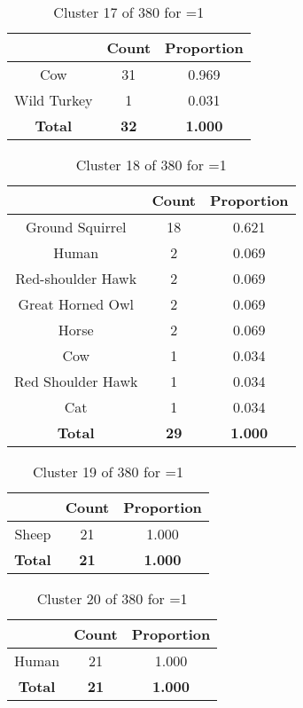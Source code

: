 \begin{table}[ht!]
\centering
\begin{tabular}{|c|c|c|}
\hline
\bf \Spec{} &\bf Count &\bf Proportion\\ \hline \hline
Cow & 31 & 0.969\\ \hline
Wild Turkey & 1 & 0.031\\ \hline
\hline
\bf Total & \bf 32 & \bf 1.000\\ \hline
\end{tabular}
\label{tab:cluster:17:1}
\caption{Cluster 17 of 380 for \minneigh{}=1}
\end{table}

\begin{table}[ht!]
\centering
\begin{tabular}{|c|c|c|}
\hline
\bf \Spec{} &\bf Count &\bf Proportion\\ \hline \hline
Ground Squirrel & 18 & 0.621\\ \hline
Human & 2 & 0.069\\ \hline
Red-shoulder Hawk & 2 & 0.069\\ \hline
Great Horned Owl & 2 & 0.069\\ \hline
Horse & 2 & 0.069\\ \hline
Cow & 1 & 0.034\\ \hline
Red Shoulder Hawk & 1 & 0.034\\ \hline
Cat & 1 & 0.034\\ \hline
\hline
\bf Total & \bf 29 & \bf 1.000\\ \hline
\end{tabular}
\label{tab:cluster:18:1}
\caption{Cluster 18 of 380 for \minneigh{}=1}
\end{table}

\begin{table}[ht!]
\centering
\begin{tabular}{|c|c|c|}
\hline
\bf \Spec{} &\bf Count &\bf Proportion\\ \hline \hline
Sheep & 21 & 1.000\\ \hline
\hline
\bf Total & \bf 21 & \bf 1.000\\ \hline
\end{tabular}
\label{tab:cluster:19:1}
\caption{Cluster 19 of 380 for \minneigh{}=1}
\end{table}

\clearpage
\begin{table}[ht!]
\centering
\begin{tabular}{|c|c|c|}
\hline
\bf \Spec{} &\bf Count &\bf Proportion\\ \hline \hline
Human & 21 & 1.000\\ \hline
\hline
\bf Total & \bf 21 & \bf 1.000\\ \hline
\end{tabular}
\label{tab:cluster:20:1}
\caption{Cluster 20 of 380 for \minneigh{}=1}
\end{table}

